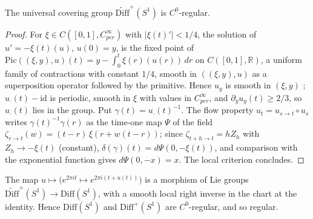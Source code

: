 \begin{theorem}
  \label{thm:circle-cover-regular}
  \leanok
  The universal covering group $\widetilde{\mathrm{Diff}}^+(S^1)$ is $C^0$-regular.
\end{theorem}

\begin{proof}
  \leanok
  For $\xi \in C([0, 1], C^\infty_{per})$ with $|\xi(t)'| < 1/4$, the solution of
  $u' = -\xi(t)(u)$, $u(0) = y$, is the fixed point of
  $\mathrm{Pic}((\xi, y), u)(t) = y - \int_0^t \xi(r)(u(r))\,dr$ on $C([0, 1], \mathbb R)$, a
  uniform family of contractions with constant $1/4$, smooth in $((\xi, y), u)$ as a superposition
  operator followed by the primitive. Hence $u_y$ is smooth in $(\xi, y)$
  \cite[Proposition 2.3.27(a)]{GN26}; $u_\cdot(t) - \mathrm{id}$ is periodic, smooth in $\xi$
  with values in $C^\infty_{per}$, and $\partial_y u_y(t) \geq 2/3$, so $u_\cdot(t)$ lies in the
  group. Put $\gamma(t) = u_\cdot(t)^{-1}$. The flow property $u_t = u_{s \to t} \circ u_s$ writes
  $\gamma(t)^{-1}\gamma(r)$ as the time-one map $\Psi$ of the field
  $\zeta_{r \to t}(w) = (t - r)\,\xi(r + w(t - r))$; since $\zeta_{t + h \to t} = h Z_h$ with
  $Z_h \to -\xi(t)$ (constant), $\delta(\gamma)(t) = d\Psi(0, -\xi(t))$, and comparison with the
  exponential function gives $d\Psi(0, -x) = x$. The local criterion concludes.
\end{proof}

\begin{theorem}
  \label{thm:diff-circle-regular}
  \leanok
  The map $u \mapsto \big(e^{2\pi i t} \mapsto e^{2\pi i(t + u(t))}\big)$ is a morphism of Lie
  groups $\widetilde{\mathrm{Diff}}^+(S^1) \to \mathrm{Diff}(S^1)$, with a smooth local right
  inverse in the chart at the identity. Hence $\mathrm{Diff}(S^1)$ and $\mathrm{Diff}^+(S^1)$ are
  $C^0$-regular, and so regular.
\end{theorem}


